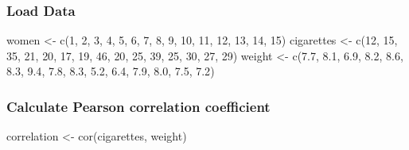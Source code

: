 \documentclass[
]{article}
\newenvironment{Shaded}{\begin{snugshade}}{\end{snugshade}}
\newcommand{\DecValTok}[1]{\textcolor[rgb]{0.00,0.00,0.81}{#1}}
\newcommand{\FloatTok}[1]{\textcolor[rgb]{0.00,0.00,0.81}{#1}}
\newcommand{\FunctionTok}[1]{\textcolor[rgb]{0.00,0.00,0.00}{#1}}
\newcommand{\NormalTok}[1]{#1}
\newcommand{\OtherTok}[1]{\textcolor[rgb]{0.56,0.35,0.01}{#1}}
\begin{document}
\hypertarget{load-data-1}{%
\subsubsection{Load Data}\label{load-data-1}}

\begin{Shaded}
\begin{Highlighting}[]
\NormalTok{women }\OtherTok{\textless{}{-}} \FunctionTok{c}\NormalTok{(}\DecValTok{1}\NormalTok{, }\DecValTok{2}\NormalTok{, }\DecValTok{3}\NormalTok{, }\DecValTok{4}\NormalTok{, }\DecValTok{5}\NormalTok{, }\DecValTok{6}\NormalTok{, }\DecValTok{7}\NormalTok{, }\DecValTok{8}\NormalTok{, }\DecValTok{9}\NormalTok{, }\DecValTok{10}\NormalTok{, }\DecValTok{11}\NormalTok{, }\DecValTok{12}\NormalTok{, }\DecValTok{13}\NormalTok{, }\DecValTok{14}\NormalTok{, }\DecValTok{15}\NormalTok{)}
\NormalTok{cigarettes }\OtherTok{\textless{}{-}} \FunctionTok{c}\NormalTok{(}\DecValTok{12}\NormalTok{, }\DecValTok{15}\NormalTok{, }\DecValTok{35}\NormalTok{, }\DecValTok{21}\NormalTok{, }\DecValTok{20}\NormalTok{, }\DecValTok{17}\NormalTok{, }\DecValTok{19}\NormalTok{, }\DecValTok{46}\NormalTok{, }\DecValTok{20}\NormalTok{, }\DecValTok{25}\NormalTok{, }\DecValTok{39}\NormalTok{, }\DecValTok{25}\NormalTok{, }\DecValTok{30}\NormalTok{, }\DecValTok{27}\NormalTok{, }\DecValTok{29}\NormalTok{)}
\NormalTok{weight }\OtherTok{\textless{}{-}} \FunctionTok{c}\NormalTok{(}\FloatTok{7.7}\NormalTok{, }\FloatTok{8.1}\NormalTok{, }\FloatTok{6.9}\NormalTok{, }\FloatTok{8.2}\NormalTok{, }\FloatTok{8.6}\NormalTok{, }\FloatTok{8.3}\NormalTok{, }\FloatTok{9.4}\NormalTok{, }\FloatTok{7.8}\NormalTok{, }\FloatTok{8.3}\NormalTok{, }\FloatTok{5.2}\NormalTok{, }\FloatTok{6.4}\NormalTok{, }\FloatTok{7.9}\NormalTok{, }\FloatTok{8.0}\NormalTok{, }\FloatTok{7.5}\NormalTok{, }\FloatTok{7.2}\NormalTok{)}
\end{Highlighting}
\end{Shaded}

\hypertarget{calculate-pearson-correlation-coefficient}{%
\subsubsection{Calculate Pearson correlation
coefficient}\label{calculate-pearson-correlation-coefficient}}

\begin{Shaded}
\begin{Highlighting}[]
\NormalTok{correlation }\OtherTok{\textless{}{-}} \FunctionTok{cor}\NormalTok{(cigarettes, weight)}
\end{Highlighting}
\end{Shaded}
\end{document}
